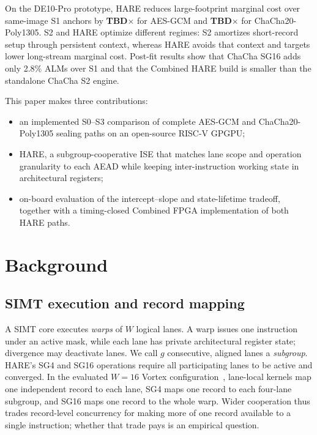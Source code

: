 \documentclass[conference]{IEEEtran}
\newcommand{\AESBoardSpeedup}{\textbf{TBD}\ensuremath{\times}}
\newcommand{\ChaChaBoardSpeedup}{\textbf{TBD}\ensuremath{\times}}
\begin{document}
On the DE10-Pro prototype, HARE reduces large-footprint marginal cost over
same-image S1 anchors by \AESBoardSpeedup{} for AES-GCM and
\ChaChaBoardSpeedup{} for ChaCha20-Poly1305. S2 and HARE optimize different
regimes: S2 amortizes short-record setup through persistent context, whereas
HARE avoids that context and targets lower long-stream marginal cost. Post-fit
results show that ChaCha SG16 adds only 2.8\% ALMs over S1 and that the Combined
HARE build is smaller than the standalone ChaCha S2 engine.

This paper makes three contributions:
\begin{itemize}
\item an implemented S0--S3 comparison of complete AES-GCM and
  ChaCha20-Poly1305 sealing paths on an open-source RISC-V GPGPU;
\item HARE, a subgroup-cooperative ISE that matches lane scope and operation
  granularity to each AEAD while keeping inter-instruction working state in
  architectural registers;
\item on-board evaluation of the intercept--slope and state-lifetime tradeoff,
  together with a timing-closed Combined FPGA implementation of both HARE
  paths.
\end{itemize}

\section{Background}\label{sec:background}

\subsection{SIMT execution and record mapping}
A SIMT core executes \emph{warps} of $W$ logical lanes. A warp issues one
instruction under an active mask, while each lane has private architectural
register state; divergence may deactivate lanes. We call $g$ consecutive,
aligned lanes a \emph{subgroup}. HARE's SG4 and SG16 operations require all
participating lanes to be active and converged. In the evaluated $W{=}16$
Vortex configuration~\cite{tine2021vortex}, lane-local kernels map one
independent record to each lane, SG4 maps one record to each four-lane
subgroup, and SG16 maps one record to the whole warp. Wider cooperation thus
trades record-level concurrency for making more of one record available to a
single instruction; whether that trade pays is an empirical question.
\end{document}
